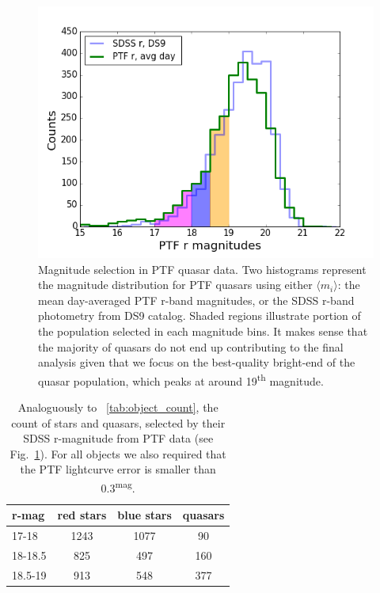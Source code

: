 \documentclass[fleqn,usenatbib]{mnras}  %
\begin{document}
\begin{figure}
\label{fig:2a}
 \includegraphics[width=1.15\columnwidth, center]{Fig_2_Quasar_PTF_population_selection.png}
 \caption{Magnitude selection in PTF quasar data. Two histograms represent the magnitude distribution for PTF quasars using either   $\langle m_{i} \rangle $: the mean day-averaged PTF r-band magnitudes, or the SDSS r-band photometry from DS9 catalog. Shaded regions illustrate portion of the population selected in each magnitude bins. It makes sense that the majority of quasars do not end up contributing to the final analysis given that we focus on the best-quality bright-end of the quasar population, which peaks  at around 19\textsuperscript{th} magnitude.   }
\end{figure}


\begin{table}
\centering
\caption{Analoguously to ~\ref{tab:object_count}, the count of stars and quasars, selected by their SDSS r-magnitude from PTF data (see Fig.~\ref{fig:2a}). For all objects we also required that the PTF lightcurve error is smaller than 0.3\textsuperscript{mag}.}
\label{tab:object_count_PTF}
\begin{tabular}{ l|ccc } 
r-mag  & red stars & blue stars & quasars \\ 
 \hline
17-18   & 1243 & 1077   & 90    \\ 
18-18.5 & 825 &  497  & 160   \\ 
18.5-19 & 913 &  548  & 377   
\end{tabular}
\end{table}
\end{document}
